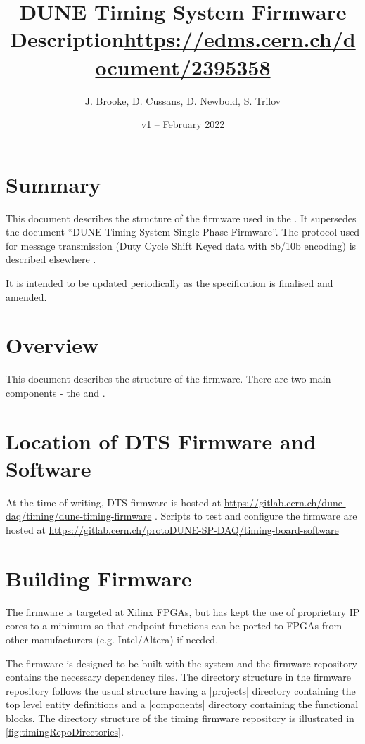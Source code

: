 \documentclass{dune}
\title{DUNE Timing System Firmware Description\newline\url{https://edms.cern.ch/document/2395358}}
\author{J. Brooke, D. Cussans, D. Newbold, S. Trilov}
\date{v1 -- February 2022}
\begin{document}
\maketitle
\tableofcontents


\section{Summary}

This document describes the structure of the firmware used in the . It supersedes the document ``DUNE Timing System-Single Phase Firmware''. The protocol used for message transmission (Duty Cycle Shift Keyed data with 8b/10b encoding) is described elsewhere \cite{ref:dts-timing-protocol}.

It is intended to be updated periodically as the specification is finalised and amended.

\section{Overview}

This document describes the structure of the  firmware. There are two main components - the  and .

\section{Location of DTS Firmware and Software}

At the time of writing, DTS firmware is hosted at \url{https://gitlab.cern.ch/dune-daq/timing/dune-timing-firmware} . Scripts to test and configure the  firmware are hosted at \url{https://gitlab.cern.ch/protoDUNE-SP-DAQ/timing-board-software}

\section{Building Firmware}

The firmware is targeted at Xilinx FPGAs, but has kept the use of proprietary IP cores to a minimum so that endpoint functions can be ported to FPGAs from other manufacturers (e.g. Intel/Altera) if needed.

The firmware is designed to be built with the  system and the firmware repository contains the necessary dependency files. The directory structure in the firmware repository follows the usual  structure having a |projects| directory containing the top level entity definitions and a |components| directory containing the functional blocks. The directory structure of the timing firmware repository is illustrated in \ref{fig:timingRepoDirectories}.
\end{document}
